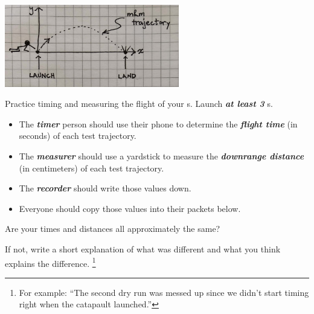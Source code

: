\begin{center}
\includegraphics[width=3in]{../launch-and-landing.jpg}
\end{center}

Practice timing and measuring the flight of your \mymm{}s. 
Launch {\bfseries\itshape at least 3} \mymm{}s. 
\begin{itemize}[nosep]
    \item The {\bfseries\itshape timer} person should use their phone to determine 
        the {\bfseries\itshape flight time} (in seconds) of each test trajectory.
    \item The {\bfseries\itshape measurer} should use a yardstick to measure 
        the {\bfseries\itshape downrange distance} (in centimeters) of each test trajectory.
    \item The {\bfseries\itshape recorder} should write those values down.
    \item Everyone should copy those values into their packets below.
\end{itemize}


Are your times and distances all approximately the same? 

If not, write a short explanation of what was different and 
what you think explains the difference.%
\footnote{%
    For example:%
    ``The second dry run was messed up since we didn't 
    start timing right when the catapault launched.''
}

